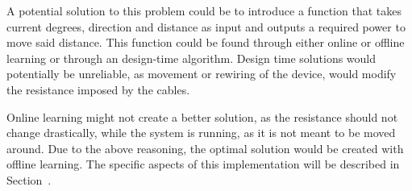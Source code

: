A potential solution to this problem could be to introduce a function that takes current degrees, direction and distance as input and outputs a required power to move said distance.
This function could be found through either online or offline learning or through an design-time algorithm.
Design time solutions would potentially be unreliable, as movement or rewiring of the device, would modify the resistance imposed by the cables.

Online learning might not create a better solution, as the resistance should not change drastically, while the system is running, as it is not meant to be moved around.
Due to the above reasoning, the optimal solution would be created with offline learning.
The specific aspects of this implementation will be described in Section~.
